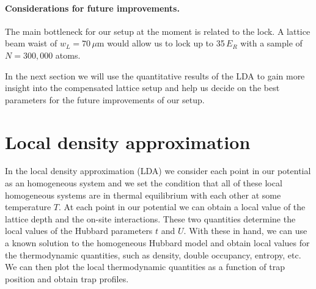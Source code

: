 \documentclass[11pt,letter]{article}
\begin{document}
\paragraph{Considerations for future improvements.}  The main bottleneck for
our setup at the moment is related to the lock.  A lattice beam waist of
$w_{L}=70\,\mu$m  would allow us to lock up to 35\,$E_{R}$ with a sample of
$N=300,000$ atoms.   

In the next section we will use the quantitative results of the LDA to gain
more insight into the compensated lattice setup and help us decide on the best
parameters for the future improvements of our setup. 


\section{ Local density approximation }
\label{sec:lda}

In the local density approximation (LDA) we consider each point in our
potential as an homogeneous system and we set the condition that all of these
local homogeneous systems are in thermal equilibrium with each other  at some
temperature $T$.   At each point in our potential we can obtain a local value
of the lattice depth and the on-site interactions. These two quantities
determine the local values of the Hubbard parameters $t$ and $U$.  With these
in hand, we can use a known solution to the homogeneous Hubbard model and
obtain local values for the thermodynamic quantities, such as density, double
occupancy, entropy, etc.   We can then plot the local thermodynamic quantities
as a function of trap position and obtain trap profiles.   
\end{document}
